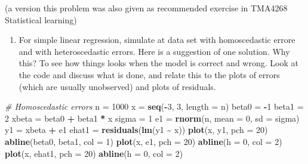 \documentclass[
]{article}
\newenvironment{Shaded}{\begin{snugshade}}{\end{snugshade}}
\newcommand{\AttributeTok}[1]{\textcolor[rgb]{0.13,0.29,0.53}{#1}}
\newcommand{\CommentTok}[1]{\textcolor[rgb]{0.56,0.35,0.01}{\textit{#1}}}
\newcommand{\DecValTok}[1]{\textcolor[rgb]{0.00,0.00,0.81}{#1}}
\newcommand{\FunctionTok}[1]{\textcolor[rgb]{0.13,0.29,0.53}{\textbf{#1}}}
\newcommand{\NormalTok}[1]{#1}
\newcommand{\OtherTok}[1]{\textcolor[rgb]{0.56,0.35,0.01}{#1}}
\newcommand{\SpecialCharTok}[1]{\textcolor[rgb]{0.81,0.36,0.00}{\textbf{#1}}}
\providecommand{\tightlist}{%
  \setlength{\itemsep}{0pt}\setlength{\parskip}{0pt}}
\begin{document}
(a version this problem was also given as recommended exercise in
TMA4268 Statistical learning)

\begin{enumerate}
\def\labelenumi{\arabic{enumi}.}
\tightlist
\item
  For simple linear regression, simulate at data set with homoscedastic
  errore and with heteroscedastic errors. Here is a suggestion of one
  solution. Why this? To see how things looks when the model is correct
  and wrong. Look at the code and discuss what is done, and relate this
  to the plots of errors (which are usually unobserved) and plots of
  residuals.
\end{enumerate}

\begin{Shaded}
\begin{Highlighting}[]
\CommentTok{\# Homoscedastic errors}
\NormalTok{n }\OtherTok{=} \DecValTok{1000}
\NormalTok{x }\OtherTok{=} \FunctionTok{seq}\NormalTok{(}\SpecialCharTok{{-}}\DecValTok{3}\NormalTok{, }\DecValTok{3}\NormalTok{, }\AttributeTok{length =}\NormalTok{ n)}
\NormalTok{beta0 }\OtherTok{=} \SpecialCharTok{{-}}\DecValTok{1}
\NormalTok{beta1 }\OtherTok{=} \DecValTok{2}
\NormalTok{xbeta }\OtherTok{=}\NormalTok{ beta0 }\SpecialCharTok{+}\NormalTok{ beta1 }\SpecialCharTok{*}\NormalTok{ x}
\NormalTok{sigma }\OtherTok{=} \DecValTok{1}
\NormalTok{e1 }\OtherTok{=} \FunctionTok{rnorm}\NormalTok{(n, }\AttributeTok{mean =} \DecValTok{0}\NormalTok{, }\AttributeTok{sd =}\NormalTok{ sigma)}
\NormalTok{y1 }\OtherTok{=}\NormalTok{ xbeta }\SpecialCharTok{+}\NormalTok{ e1}
\NormalTok{ehat1 }\OtherTok{=} \FunctionTok{residuals}\NormalTok{(}\FunctionTok{lm}\NormalTok{(y1 }\SpecialCharTok{\textasciitilde{}}\NormalTok{ x))}
\FunctionTok{plot}\NormalTok{(x, y1, }\AttributeTok{pch =} \DecValTok{20}\NormalTok{)}
\FunctionTok{abline}\NormalTok{(beta0, beta1, }\AttributeTok{col =} \DecValTok{1}\NormalTok{)}
\FunctionTok{plot}\NormalTok{(x, e1, }\AttributeTok{pch =} \DecValTok{20}\NormalTok{)}
\FunctionTok{abline}\NormalTok{(}\AttributeTok{h =} \DecValTok{0}\NormalTok{, }\AttributeTok{col =} \DecValTok{2}\NormalTok{)}
\FunctionTok{plot}\NormalTok{(x, ehat1, }\AttributeTok{pch =} \DecValTok{20}\NormalTok{)}
\FunctionTok{abline}\NormalTok{(}\AttributeTok{h =} \DecValTok{0}\NormalTok{, }\AttributeTok{col =} \DecValTok{2}\NormalTok{)}


\end{Highlighting}
\end{Shaded}
\end{document}
